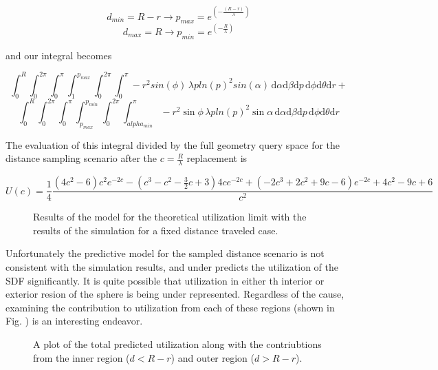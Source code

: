 $$ d_{min} = R-r \rightarrow p_{max} = e^{(-\frac{(R-r)}{\lambda})} $$
$$ d_{max} = R   \rightarrow p_{min} = e^{(-\frac{R}{\lambda})} $$

and our integral becomes

$$ \int_{0}^{R}\int_{0}^{2\pi}\int_{0}^{\pi}\int_{1}^{p_{max}}\int_{0}^{2\pi}\int_{0}^{\pi}
-r^2sin(\phi) \, \lambda p ln(p)^2 sin(\alpha) \, \mathrm{d}\alpha \mathrm{d}\beta \mathrm{d}p \, \mathrm{d}\phi
\mathrm{d}\theta \mathrm{d}r + $$
$$ \int_{0}^{R}\int_{0}^{2\pi}\int_{0}^{\pi}\int_{p_{max}}^{p_{min}}\int_{0}^{2\pi}\int_{alpha_{min}}^{\pi}
-r^2\sin{\phi} \, \lambda p ln(p)^2 \sin{\alpha} \, \mathrm{d}\alpha \mathrm{d}\beta \mathrm{d}p \, \mathrm{d}\phi
\mathrm{d}\theta \mathrm{d}r $$

The evaluation of this integral divided by the full geometry query space for the
distance sampling scenario after the $c=\frac{R}{\lambda}$ replacement is

$$U(c) = \frac{1}{4}\frac{(4 c^2-6) c^2e^{-2c} - (c^3-c^2-\frac{3}{2}
c+3)4ce^{-2c}+(-2 c^3+2c^2+9c-6) e^{-2c}+4c^2-9 c+6}{c^2}$$

\begin{figure}[ht] \label{fig:sdf_sampled_dist}
\centering
{\textwidth}
\caption{Results of the model for the theoretical utilization limit with the
results of the simulation for a fixed distance traveled case.}
\end{figure}

Unfortunately the predictive model for the sampled distance scenario is not
consistent with the simulation results, and under predicts the utilization of
the SDF significantly. It is quite possible that utilization in either th interior or exterior
resion of the sphere is being under represented. Regardless of the cause, examining the contribution to
utilization from each of these regions (shown in
Fig. \label{fig:util_region_contributions}) is an interesting endeavor.


\begin{figure}[ht] \label{fig:util_region_contributions}
\centering
{\textwidth}
\caption{A plot of the total predicted utilization along with the contriubtions
from the inner region ($d < R-r$) and outer region ($d > R-r$).}
\end{figure}

